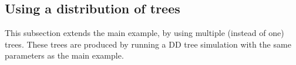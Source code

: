 \newpage



\newpage



\newpage



\newpage



\newpage



\newpage



\newpage

\subsection{Using a distribution of trees}
\label{subsec:distribution}

This subsection extends the main example, by using multiple (instead of
one) trees. These trees are produced by running a DD tree simulation
with the same parameters as the main example.

